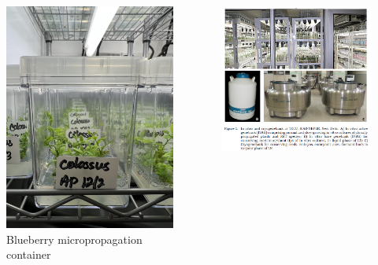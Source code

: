 \documentclass[
  ignorenonframetext,
  aspectratio=169]{beamer}
\begin{document}
\begin{frame}{}
\protect\hypertarget{section-1}{}
\begin{columns}[T,onlytextwidth]

\begin{figure}
\includegraphics[width=0.7\linewidth]{../images/blueberry-propagation} \caption{Blueberry micropropagation container}\label{fig:blueberry-propagation-media}
\end{figure}



\includegraphics[width=0.8\linewidth]{../images/invitro-gene-banks} 

\end{columns}
\end{frame}
\end{document}
